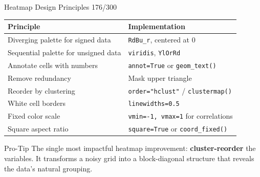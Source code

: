 \documentclass[10pt]{beamer}
\newcommand{\smark}[1]{\hfill{\scriptsize\color{codegray}#1}}
\begin{document}
\begin{frame}{Heatmap Design Principles}
\smark{176/300}
\centering\small
\begin{tabular}{@{}ll@{}}
    \toprule
    \textbf{Principle} & \textbf{Implementation} \\
    \midrule
    Diverging palette for signed data    & \texttt{RdBu\_r}, centered at 0 \\
    Sequential palette for unsigned data & \texttt{viridis}, \texttt{YlOrRd} \\
    Annotate cells with numbers          & \texttt{annot=True} or \texttt{geom\_text()} \\
    Remove redundancy                    & Mask upper triangle \\
    Reorder by clustering                & \texttt{order="hclust"} / \texttt{clustermap()} \\
    White cell borders                   & \texttt{linewidths=0.5} \\
    Fixed color scale                    & \texttt{vmin=-1, vmax=1} for correlations \\
    Square aspect ratio                  & \texttt{square=True} or \texttt{coord\_fixed()} \\
    \bottomrule
\end{tabular}

\vspace{0.3cm}
\begin{alertblock}{Pro-Tip}
    \scriptsize The single most impactful heatmap improvement: \textbf{cluster-reorder} the variables. It transforms a noisy grid into a block-diagonal structure that reveals the data's natural grouping.
\end{alertblock}
\end{frame}
\end{document}
